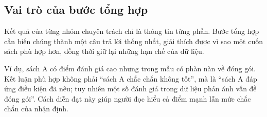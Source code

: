 \subsection{Vai trò của bước tổng hợp}
Kết quả của từng nhóm chuyên trách chỉ là thông tin từng phần. Bước tổng hợp cần biến chúng thành một câu trả lời thống nhất, giải thích được vì sao một cuốn sách phù hợp hơn, đồng thời giữ lại những hạn chế của dữ liệu.

Ví dụ, sách A có điểm đánh giá cao nhưng trong mẫu có phàn nàn về đóng gói. Kết luận phù hợp không phải ``sách A chắc chắn không tốt'', mà là ``sách A đáp ứng điều kiện đã nêu; tuy nhiên một số đánh giá trong dữ liệu phản ánh vấn đề đóng gói''. Cách diễn đạt này giúp người đọc hiểu cả điểm mạnh lẫn mức chắc chắn của nhận định.
